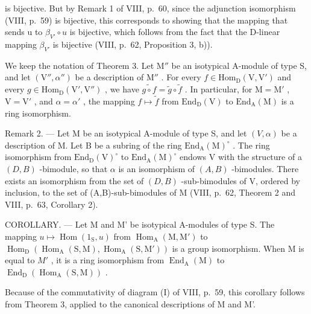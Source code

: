 is bijective. But by Remark 1 of VIII, p.~60, since the adjunction isomorphism (VIII, p.~59) is bijective, this corresponds to showing that the mapping that sends u to \(\beta_{V'} \circ u\) is bijective, which follows from the fact that the D-linear mapping \(\beta_{V'}\) is bijective (VIII, p.~62, Proposition 3, b)).

We keep the notation of Theorem 3. Let \(\mathrm{M}''\) be an isotypical A-module of type S, and let \((\mathrm{V}'',\alpha '')\) be a description of \(\mathrm{M}''\) . For every \(f\in \mathrm{Hom}_{\mathrm{D}}(\mathrm{V},\mathrm{V}')\) and every \(g\in \mathrm{Hom}_{\mathrm{D}}(\mathrm{V}',\mathrm{V}'')\) , we have \(\widetilde{g\circ f} = \widetilde{g}\circ \widetilde{f}\) . In particular, for \(\mathrm{M} = \mathrm{M}'\) , \(\mathrm{V} = \mathrm{V}'\) , and \(\alpha = \alpha '\) , the mapping \(f\mapsto \widetilde{f}\) from \(\mathrm{End}_{\mathrm{D}}(\mathrm{V})\) to \(\mathrm{End}_{\mathrm{A}}(\mathrm{M})\) is a ring isomorphism.

Remark 2. --- Let M be an isotypical A-module of type S, and let \((V,\alpha)\) be a description of M. Let B be a subring of the ring \(\mathrm{End}_{\mathrm{A}}(\mathrm{M})^{\circ}\) . The ring isomorphism from \(\mathrm{End}_{\mathrm{D}}(\mathrm{V})^{\circ}\) to \(\mathrm{End}_{\mathrm{A}}(\mathrm{M})^{\circ}\) endows V with the structure of a \((D,B)\) -bimodule, so that \(\alpha\) is an isomorphism of \((A,B)\) -bimodules. There exists an isomorphism from the set of \((D,B)\) -sub-bimodules of V, ordered by inclusion, to the set of (A,B)-sub-bimodules of M (VIII, p.~62, Theorem 2 and VIII, p.~63, Corollary 2).

COROLLARY. --- Let M and M' be isotypical A-modules of type S. The mapping \(u \mapsto \operatorname{Hom}(1_{\mathrm{S}}, u)\) from \(\operatorname{Hom}_{\mathrm{A}}(\mathrm{M}, \mathrm{M}')\) to \(\operatorname{Hom}_{\mathrm{D}}(\operatorname{Hom}_{\mathrm{A}}(\mathrm{S}, \mathrm{M}), \operatorname{Hom}_{\mathrm{A}}(\mathrm{S}, \mathrm{M}'))\) is a group isomorphism. When M is equal to \(M'\) , it is a ring isomorphism from \(\operatorname{End}_{\mathrm{A}}(\mathrm{M})\) to \(\operatorname{End}_{\mathrm{D}}(\operatorname{Hom}_{\mathrm{A}}(\mathrm{S}, \mathrm{M}))\) .

Because of the commutativity of diagram (I) of VIII, p.~59, this corollary follows from Theorem 3, applied to the canonical descriptions of M and M'.
\relax{}
